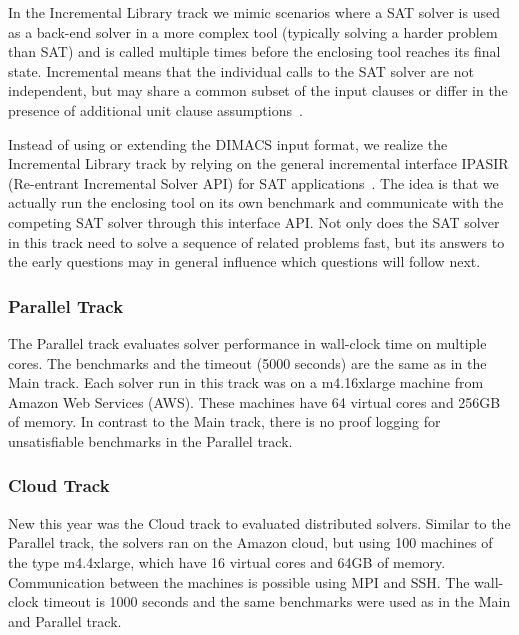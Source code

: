 \documentclass{elsarticle}
\begin{document}
In the Incremental Library track we mimic scenarios
where a SAT solver is used as a back-end solver in a more complex tool
(typically solving a harder problem than SAT) and is called multiple times before 
the enclosing tool reaches its final state. Incremental means that
the individual calls to the SAT solver are not independent, but may share 
a common subset of the input clauses or differ in the presence of additional 
unit clause assumptions~\cite{Nadel:2014:Incremental,Fazekas:2019:IncrementalInprocessing}. 

Instead of using or extending the DIMACS input format, we realize the Incremental Library track
by relying on the general incremental interface IPASIR (Re-entrant Incremental Solver API) 
for SAT applications~\cite{Balyo:2015:SATRace}. The idea is that we actually run the 
enclosing tool on its own benchmark and communicate with the competing SAT solver 
through this interface API. Not only does the SAT solver in this track
need to solve a sequence of related problems fast, but its answers to the early questions
may in general influence which questions will follow next.

\subsubsection{Parallel Track}

The Parallel track evaluates solver performance in wall-clock time on multiple cores.
The benchmarks and the timeout (5000 seconds) are the same as in the Main track. 
Each solver run in this track was on a m4.16xlarge machine from Amazon Web Services (AWS).
These machines have 64 virtual cores and 256GB of memory. In contrast to the 
Main track, there is no proof logging for unsatisfiable benchmarks in the Parallel track. 

\subsubsection{Cloud Track}

New this year was the Cloud track to evaluated distributed solvers. Similar to the
Parallel track, the solvers ran on the Amazon cloud, but using 100 machines of the
type m4.4xlarge, which have 16 virtual cores and 64GB of memory. 
Communication between the machines is possible using MPI and SSH.
The wall-clock timeout is 1000 seconds and the same benchmarks were used as in
the Main and Parallel track. 
\end{document}
